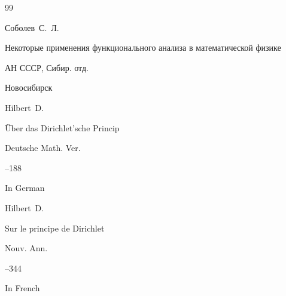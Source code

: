 \begin{thebibliography}{99}














\by Соболев~С.~Л.

\book Некоторые применения функционального анализа в математической физике


\publ АН СССР, Сибир. отд.

\publaddr Новосибирск






\by Hilbert~D.

\paper \"Uber das Dirichlet’sche Princip

\jour Deutsche Math. Ver.




--188

\lang In German



\transl

\by Hilbert~D.

\paper Sur le principe de Dirichlet

\jour Nouv. Ann.




--344

\lang In French






\end{thebibliography}
